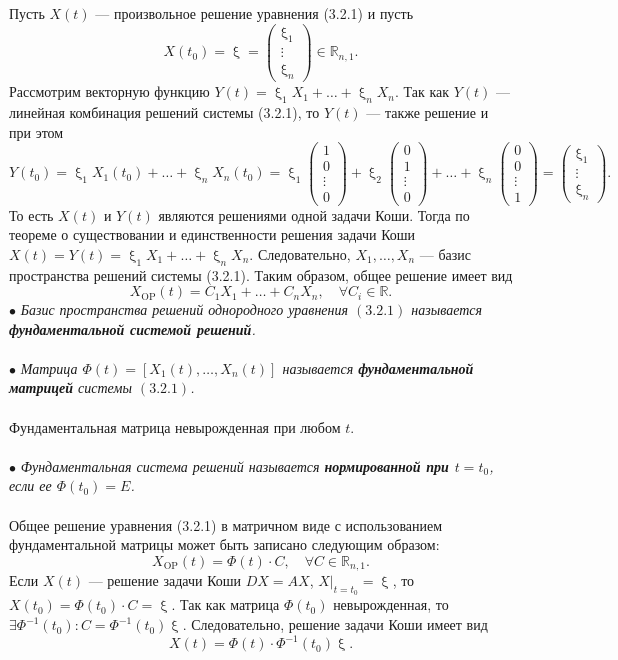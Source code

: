 \documentclass[a4paper, 12pt]{report}
\newcommand{\Rm}{\mathbb{R}}
\newcommand{\FI}{\Phi}
\renewcommand{\xi}{\upxi}
\begin{document}
Пусть $X(t)$ --- произвольное решение уравнения (3.2.1) и пусть $$X(t_0) = \xi = \begin{pmatrix}
	\xi_1 \\ \vdots \\ \xi_n
\end{pmatrix} \in \Rm_{n,1}.$$ Рассмотрим векторную функцию $Y(t) = \xi_1X_1 + \ldots + \xi_nX_n$. Так как $Y(t)$ --- линейная комбинация решений системы (3.2.1), то $Y(t)$ --- также решение и при этом $$Y(t_0) = \xi_1X_1(t_0) + \ldots + \xi_nX_n(t_0) = \xi_1\begin{pmatrix}
1\\0\\\vdots\\0
\end{pmatrix} + \xi_2\begin{pmatrix}
0\\1\\\vdots\\0
\end{pmatrix} + \ldots + \xi_n\begin{pmatrix}
0\\0\\\vdots\\1
\end{pmatrix} = \begin{pmatrix}
\xi_1 \\ \vdots \\ \xi_n
\end{pmatrix}.$$
То есть $X(t)$ и $Y(t)$ являются решениями одной задачи Коши. Тогда по теореме о существовании и единственности решения задачи Коши $X(t) = Y(t) = \xi_1X_1 + \ldots + \xi_nX_n$. Следовательно, $X_1,\ldots,X_n$ --- базис пространства решений системы (3.2.1). Таким образом, общее решение имеет вид $$X_{\text{OP}}(t) = C_1X_1 + \ldots + C_nX_n,\quad \forall C_i \in \Rm.$$
$\bullet$ \textit{Базис пространства решений однородного уравнения $(3.2.1)$ называется \textbf{фундаментальной системой решений}.}\\\\
$\bullet$ \textit{Матрица $\FI(t) = [X_1(t),\ldots,X_n(t)]$ называется \textbf{фундаментальной матрицей} системы $(3.2.1)$.}\\\\
Фундаментальная матрица невырожденная при любом $t$.\\\\
$\bullet$ \textit{Фундаментальная система решений называется \textbf{нормированной при $t = t_0$}, если ее $\FI(t_0) = E$.}\\\\
Общее решение уравнения (3.2.1) в матричном виде с использованием фундаментальной матрицы может быть записано следующим образом: $$X_{\text{OP}}(t) = \FI(t)\cdot C, \quad \forall C \in \Rm_{n,1}.$$
Если $X(t)$ --- решение задачи Коши $DX = AX$, $X|_{t=t_0} = \xi$, то $X(t_0) = \FI(t_0)\cdot C = \xi$. Так как матрица $\FI(t_0)$ невырожденная, то $\exists \FI^{-1}(t_0) : C = \FI^{-1}(t_0)\xi$. Следовательно, решение задачи Коши имеет вид $$X(t) = \FI(t)\cdot \FI^{-1}(t_0)\xi.$$
\end{document}
